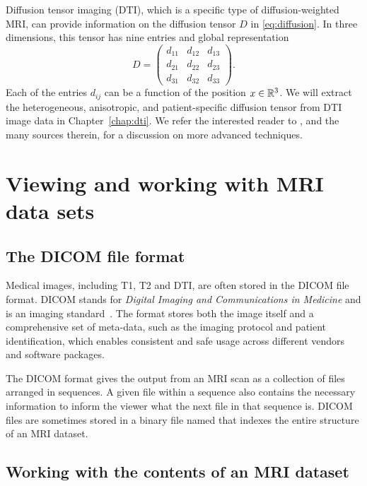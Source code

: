 Diffusion tensor imaging (DTI), which is a specific type of
diffusion-weighted MRI, can provide information on the diffusion
tensor $D$ in \eqref{eq:diffusion}. In three dimensions, this tensor
has nine entries and global representation
\begin{equation}
D = \begin{pmatrix}
  d_{11} & d_{12} & d_{13} \\
  d_{21} & d_{22} & d_{23} \\
  d_{31} & d_{32} & d_{33}
\end{pmatrix}.
\end{equation}
Each of the entries $d_{ij}$ can be a function of the position $x \in
\mathbb{R}^3$. We will extract the heterogeneous, anisotropic,
and patient-specific diffusion tensor from DTI 
image data in Chapter~\ref{chap:dti}. We refer the interested reader to
\cite{jeurissen2017}, and the many sources therein, for a discussion
on more advanced techniques.

\section{Viewing and working with MRI data sets}
\label{sec:chp2:tools:viewers}

\subsection{The DICOM file format}

Medical images, including T1, T2 and DTI, are often stored in the
DICOM file format. DICOM stands for \emph{Digital Imaging and
  Communications in Medicine} and is an imaging
standard~\cite{mildenberger2002introduction}. The format stores both
the image itself and a comprehensive set of meta-data, such as
the imaging protocol and patient identification, which enables
consistent and safe usage across different vendors and software
packages.  

The DICOM format gives the output from an MRI scan as a collection of
files arranged in sequences. A given file within a sequence also
contains the necessary information to inform the viewer what the
next file in that sequence is. DICOM files are sometimes stored in a 
binary file named  that indexes the entire
structure of an MRI dataset. 

\subsection{Working with the contents of an MRI dataset}
\label{sec:chp2:viewmri}

